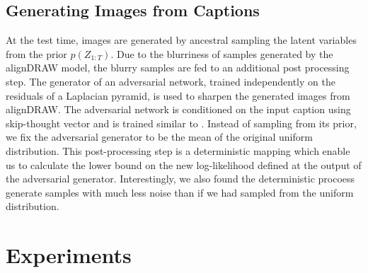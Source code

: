 \documentclass{article} %
\newcommand{\comm}[1]{}
\newcommand{\Lat}{Z}
\newcommand{\prior}{p}
\begin{document}
\subsection{Generating Images from Captions}

At the test time, images are generated by ancestral sampling the latent variables from the prior $\prior(\Lat_{1:T})$. Due to the blurriness of samples generated by the alignDRAW model, the blurry samples are fed to an additional post processing step. The generator of an adversarial network, trained independently on the residuals of a Laplacian pyramid, is used to sharpen the generated images from alignDRAW. The adversarial network is conditioned on the input caption using skip-thought vector\cite{skip-thought} and is trained similar to \citep{denton_lapgan}.    
Instead of sampling from its prior, we fix the adversarial generator to be the mean of the original uniform distribution. This post-processing step is a deterministic mapping which enable us to calculate the lower bound on the new log-likelihood defined at the output of the adversarial generator. Interestingly, we also found the deterministic procoess generate samples with much less noise than if we had sampled from the uniform distribution.

\comm{. The reconstruction loss becomes the loss between sharpened image and correct image, whereas the latent loss stays the same. We also noticed that inputting the mean of the uniform distribution into the edge generator network allowed us to generate samples with much less noise than if we had sampled from the uniform distribution.  }

\section{Experiments}
\end{document}
